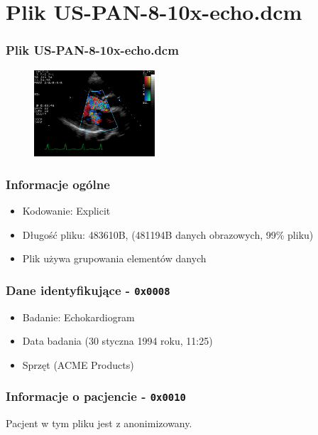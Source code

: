 \section{Plik US-PAN-8-10x-echo.dcm}
\begin{frame}
  \frametitle{Plik US-PAN-8-10x-echo.dcm}

  \begin{figure}
    \includegraphics[width=0.4\textwidth]{echo}
  \end{figure}
\end{frame}

\begin{frame}
  \frametitle{Informacje ogólne}
  \begin{itemize}
    \item Kodowanie: Explicit
    \item Długość pliku: 483610B, (481194B danych obrazowych, 99\% pliku)
    \item Plik używa grupowania elementów danych
  \end{itemize}
\end{frame}

\begin{frame}
  \frametitle{Dane identyfikujące - \texttt{0x0008}}

  \begin{itemize}
    \item Badanie: Echokardiogram
    \item Data badania (30 styczna 1994 roku, 11:25)
    \item Sprzęt (ACME Products)
  \end{itemize}
\end{frame}


\begin{frame}
  \frametitle{Informacje o pacjencie - \texttt{0x0010}}
  \begin{center}
    Pacjent w tym pliku jest z anonimizowany.
  \end{center}
\end{frame}


